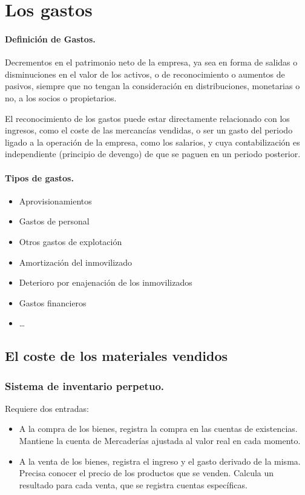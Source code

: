 \section{Los gastos}
\paragraph{Definición de Gastos.}
Decrementos en el patrimonio neto de la empresa, ya sea en forma de salidas o disminuciones en el valor de los activos, o de reconocimiento o aumentos de pasivos, siempre que no tengan la consideración en distribuciones, monetarias o no, a los socios o propietarios.

El reconocimiento de los gastos puede estar directamente relacionado con los ingresos, como el coste de las mercancías vendidas, o ser un gasto del periodo ligado a la operación de la empresa, como los salarios, y cuya contabilización es independiente (principio de devengo) de que se paguen en un periodo posterior.

\paragraph{Tipos de gastos.}
\begin{itemize}
    \item Aprovisionamientos
    \item Gastos de personal
    \item Otros gastos de explotación
    \item Amortización del inmovilizado
    \item Deterioro por enajenación de los inmovilizados
    \item Gastos financieros
    \item \dots
\end{itemize}

\subsection{El coste de los materiales vendidos}
\subsubsection{Sistema de inventario perpetuo.}
Requiere dos entradas:
\begin{itemize}
    \item A la compra de los bienes, registra la compra en las cuentas de existencias. Mantiene la cuenta de Mercaderías ajustada al valor real en cada momento.
    \item A la venta de los bienes, registra el ingreso y el gasto derivado de la misma. Precisa conocer el precio de los productos que se venden. Calcula un resultado para cada venta, que se registra cuentas específicas.
\end{itemize}

